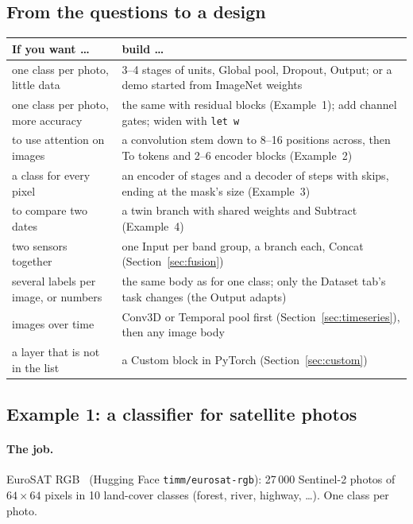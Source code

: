 \subsection{From the questions to a design}
\label{sec:build-table}
\begin{longtable}{@{}p{5.2cm}p{9.8cm}@{}}
\toprule
\textbf{If you want \dots} & \textbf{build \dots}\\
\midrule\endhead
one class per photo, little data & 3--4 stages of units, Global pool, Dropout, Output; or a demo started from ImageNet weights\\
one class per photo, more accuracy & the same with residual blocks (Example~1); add channel gates; widen with \texttt{let w}\\
to use attention on images & a convolution stem down to 8--16 positions across, then To tokens and 2--6 encoder blocks (Example~2)\\
a class for every pixel & an encoder of stages and a decoder of steps with skips, ending at the mask's size (Example~3)\\
to compare two dates & a twin branch with shared weights and Subtract (Example~4)\\
two sensors together & one Input per band group, a branch each, Concat (Section~\ref{sec:fusion})\\
several labels per image, or numbers & the same body as for one class; only the Dataset tab's task changes (the Output adapts)\\
images over time & Conv3D or Temporal pool first (Section~\ref{sec:timeseries}), then any image body\\
a layer that is not in the list & a Custom block in PyTorch (Section~\ref{sec:custom})\\
\bottomrule
\end{longtable}

\subsection{Example 1: a classifier for satellite photos}
\label{sec:build-ex1}
\paragraph{The job.} EuroSAT RGB~\cite{helber2019eurosat} (Hugging Face \texttt{timm/eurosat-rgb}): 27\,000 Sentinel-2 photos of
$64\times64$ pixels in 10 land-cover classes (forest, river, highway, \dots). One class per photo.

